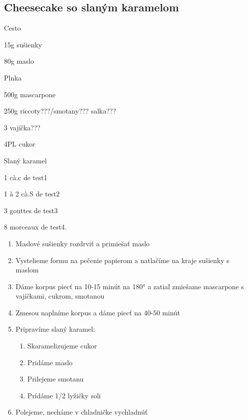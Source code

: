 \setcounter{step}{0}
\subsection{Cheesecake so slaným karamelom}

\begin{ingredient}
\def\portions{4}%

\begin{main}
	\item 
\end{main}
\begin{subingredient}{Cesto}
	\item 15g sušienky
	\item 80g maslo
\end{subingredient}
\begin{subingredient}{Plnka}
	\item 500g mascarpone
	\item 250g riccoty???/smotany??? salka???
	\item 3 vajíčka???
	\item 4PL cukor
\end{subingredient}
\begin{subingredient}{Slaný karamel}
	\item 1 cà.c de test1
	\item 1 à 2 cà.S de test2
	\item 3 gouttes de test3
	\item 8 morceaux de test4.	
\end{subingredient}

\end{ingredient}
\begin{recipe}

\begin{enumerate}

\item{Maslové sušienky rozdrviť a primiešať maslo}
\item{Vystelieme formu na pečenie papierom a natlačíme na kraje sušienky s maslom}
\item{Dáme korpus piecť na 10-15 minút na 180° a zatiaľ zmiešame mascarpone s vajíčkami, cukrom, smotanou}	
\item{Zmesou naplníme korpus a dáme piecť na 40-50 minút}
\item{Pripravíme slaný karamel:}
\begin{enumerate}
\item{Skaramelizujeme cukor}
\item{Pridáme maslo}
\item{Prilejeme smotanu}
\item{Prídáme 1/2 lyžičky soli}
\end{enumerate}
\item{Polejeme, necháme v chladničke vychladnúť}

\end{enumerate}
\end{recipe}

\begin{notes}

\end{notes}
\clearpage	